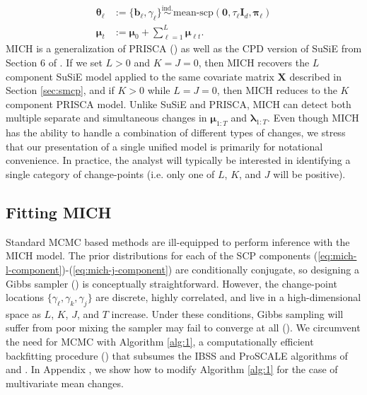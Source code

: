 \begin{align}
    \boldsymbol{\theta}_\ell &:= \{\mathbf{b}_\ell, \gamma_\ell\} \overset{\text{ind.}}{\sim} \text{mean-scp}(\mathbf{0}, \tau_\ell\mathbf{I}_d, \boldsymbol{\pi}_{\ell}) \label{eq:mich-multi} \\
    \boldsymbol{\mu}_{t} &:= \boldsymbol{\mu}_0 + \sum_{\ell = 1}^L \boldsymbol{\mu}_{\ell t}. \label{eq:mu_t-multi}
\end{align} 
MICH is a generalization of PRISCA (\citealp{Cappello22}) as well as the CPD version of SuSiE from Section 6 of \cite{Wang20}. If we set $L > 0$ and $K=J=0$, then MICH recovers the $L$ component SuSiE model applied to the same covariate matrix $\mathbf{X}$ described in Section \ref{sec:smcp}, and if $K > 0$ while $L=J=0$, then MICH reduces to the $K$ component PRISCA model. Unlike SuSiE and PRISCA, MICH can detect both multiple separate and simultaneous changes in $\boldsymbol{\mu}_{1:T}$ and $\boldsymbol{\lambda}_{1:T}$. Even though MICH has the ability to handle a combination of different types of changes, we stress that our presentation of a single unified model is primarily for notational convenience. In practice, the analyst will typically be interested in identifying a single category of change-points (i.e. only one of $L$, $K$, and $J$ will be positive).

\subsection{Fitting MICH}
\label{sec:fit-mich}

Standard MCMC based methods are ill-equipped to perform inference with the MICH model. The prior distributions for each of the SCP components (\ref{eq:mich-l-component})-(\ref{eq:mich-j-component}) are conditionally conjugate, so designing a Gibbs sampler (\citealp{Geman84}) is conceptually straightforward. However, the change-point locations $\{\gamma_\ell,\gamma_k, \gamma_j\}$ are discrete, highly correlated, and live in a high-dimensional space as $L$, $K$, $J$, and $T$ increase. Under these conditions, Gibbs sampling will suffer from poor mixing the sampler may fail to converge at all (\citealp{Smith93, Cappello21}). We circumvent the need for MCMC with Algorithm \ref{alg:1}, a computationally efficient backfitting procedure (\citealp{Friedman81, Breiman85}) that subsumes the IBSS and ProSCALE algorithms of \cite{Wang20} and \cite{Cappello22}. In Appendix , we show how to modify Algorithm \ref{alg:1} for the case of multivariate mean changes.

